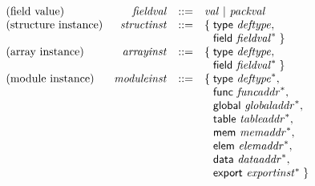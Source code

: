 $$\begin{array}{@{}lrrl@{}l@{}}
\mbox{(field value)} & {\mathit{fieldval}} &::=& {\mathit{val}} ~|~ {\mathit{packval}} \\
\mbox{(structure instance)} & {\mathit{structinst}} &::=& \{\; \begin{array}[t]{@{}l@{}l@{}}
\mathsf{type}~{\mathit{deftype}},\; \\
  \mathsf{field}~{{\mathit{fieldval}}^\ast} \;\}\end{array} \\
\mbox{(array instance)} & {\mathit{arrayinst}} &::=& \{\; \begin{array}[t]{@{}l@{}l@{}}
\mathsf{type}~{\mathit{deftype}},\; \\
  \mathsf{field}~{{\mathit{fieldval}}^\ast} \;\}\end{array} \\
\mbox{(module instance)} & {\mathit{moduleinst}} &::=& \{\; \begin{array}[t]{@{}l@{}l@{}}
\mathsf{type}~{{\mathit{deftype}}^\ast},\; \\
  \mathsf{func}~{{\mathit{funcaddr}}^\ast},\; \\
  \mathsf{global}~{{\mathit{globaladdr}}^\ast},\; \\
  \mathsf{table}~{{\mathit{tableaddr}}^\ast},\; \\
  \mathsf{mem}~{{\mathit{memaddr}}^\ast},\; \\
  \mathsf{elem}~{{\mathit{elemaddr}}^\ast},\; \\
  \mathsf{data}~{{\mathit{dataaddr}}^\ast},\; \\
  \mathsf{export}~{{\mathit{exportinst}}^\ast} \;\}\end{array} \\
\end{array}
$$

\vspace{1ex}

